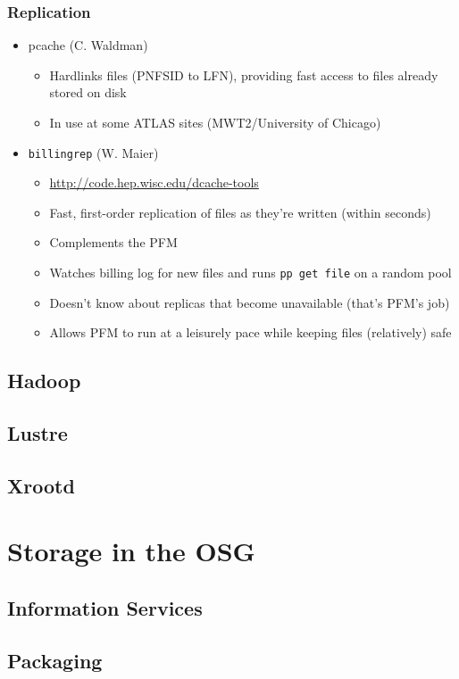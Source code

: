 \documentclass{beamer}
\begin{document}
\begin{frame}
\frametitle{Replication}
\begin{itemize}
	\item pcache (C. Waldman)
	\begin{itemize}
		\item Hardlinks files (PNFSID to LFN), providing fast access to files already stored on disk
		\item In use at some ATLAS sites (MWT2/University of Chicago)
	\end{itemize}
	\item {\tt billingrep} (W. Maier)
	\begin{itemize}
		\item \url{http://code.hep.wisc.edu/dcache-tools}
		\item Fast, first-order replication of files as they're written (within seconds)
		\item Complements the PFM
		\item Watches billing log for new files and runs {\tt pp get file} on a random pool
		\item Doesn't know about replicas that become unavailable (that's PFM's job)
		\item Allows PFM to run at a leisurely pace while keeping files (relatively) safe
	\end{itemize}
\end{itemize}
\end{frame}

\subsection{Hadoop}
\subsection{Lustre}
\subsection{Xrootd}

\section{Storage in the OSG}
\subsection{Information Services}
\subsection{Packaging}
\end{document}
